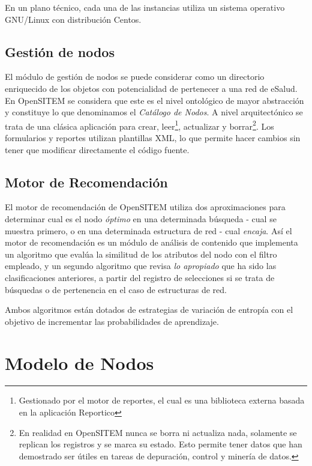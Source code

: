 En un plano técnico, cada una de las instancias utiliza un sistema operativo GNU/Linux con distribución Centos.


\subsection{Gestión de nodos}

El módulo de gestión de nodos se puede considerar como un directorio enriquecido de los objetos con potencialidad de pertenecer a una red de eSalud. En OpenSITEM se considera que este es el nivel ontológico de mayor abstracción y constituye lo que denominamos el \textit{Catálogo de Nodos}. A nivel arquitectónico se trata de una clásica aplicación para crear, leer\footnote{Gestionado por el motor de reportes, el cual es una biblioteca externa basada en la aplicación Reportico}, actualizar y borrar\footnote{En realidad en OpenSITEM nunca se borra ni actualiza nada, solamente se replican los registros y se marca su estado. Esto permite tener datos que han demostrado ser útiles en tareas de depuración, control y minería de datos.}. Los formularios y reportes utilizan plantillas XML, lo que permite hacer cambios sin tener que modificar directamente el código fuente.

\subsection{Motor de Recomendación}

El motor de recomendación de OpenSITEM utiliza dos aproximaciones para determinar cual es el nodo \textit{óptimo} en una determinada búsqueda - cual se muestra primero, o en una determinada estructura de red - cual \textit{encaja}. Así el motor de recomendación es un módulo de análisis de contenido que implementa un algoritmo que  evalúa la similitud de los atributos del nodo con el filtro empleado, y un segundo algoritmo que revisa \textit{lo apropiado} que ha sido las clasificaciones anteriores, a partir del registro de selecciones si se trata de búsquedas o de pertenencia en el caso de estructuras de red.

Ambos algoritmos están dotados de estrategias de variación de entropía con el objetivo de incrementar las probabilidades de aprendizaje. 


\section{Modelo de Nodos}

